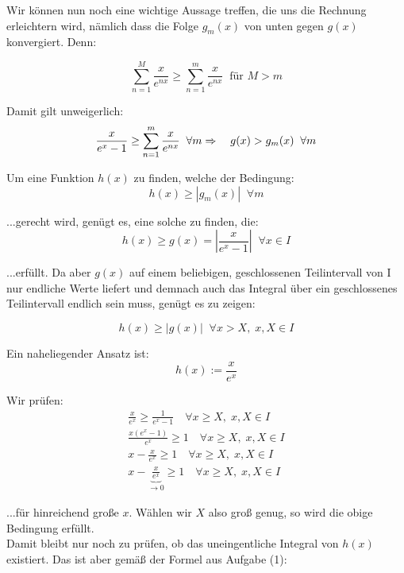\documentclass[a4paper,german,12pt,smallheadings]{scrartcl}
\begin{document}
Wir können nun noch eine wichtige Aussage treffen, die uns die Rechnung erleichtern wird, nämlich dass die Folge $g_m(x)$ von unten gegen $g(x)$ konvergiert. Denn:

\begin{equation*}
\sum_{n=1}^{M}\frac{x}{e^{nx}} \ge \sum_{n=1}^{m}\frac{x}{e^{nx}} \;\; \text{für $M>m$}
\end{equation*}

Damit gilt unweigerlich:
\begin{equation*}
\frac{x}{e^x-1} \ge \sum_{n=1}^{m}\frac{x}{e^{nx}} \;\; \forall m\\
\Rightarrow \quad g(x)>g_m(x) \;\; \forall m
\end{equation*}

Um eine Funktion $h(x)$ zu finden, welche der Bedingung:
\begin{equation*}
h(x) \geq |g_m(x)| \;\; \forall m
\end{equation*}

...gerecht wird, genügt es, eine solche zu finden, die:
\begin{equation*}
h(x)\geq g(x)=\left|\frac{x}{e^x-1}\right| \;\; \forall x \in I
\end{equation*}

...erfüllt. Da aber $g(x)$ auf einem beliebigen, geschlossenen Teilintervall von I nur endliche Werte liefert und demnach auch das Integral über ein geschlossenes Teilintervall endlich sein muss, genügt es zu zeigen:

\begin{equation*}
h(x) \geq |g(x)| \;\; \forall x>X, \; x,X\in I
\end{equation*}

Ein naheliegender Ansatz ist:
\begin{equation*}
h(x):=\frac{x}{e^x}
\end{equation*}

Wir prüfen:
\begin{align*}
\frac{x}{e^x} \geq \frac{1}{e^x-1} \quad \forall x\geq X, \; x,X\in I\\
\frac{x(e^x-1)}{e^x} \geq 1 \quad \forall x\geq X, \; x,X\in I\\
x-\frac{x}{e^x} \geq 1 \quad \forall x\geq X, \; x,X\in I\\
x-\underbrace{\frac{x}{e^x}}_{\rightarrow 0} \geq 1 \quad \forall x\geq X, \; x,X\in I
\end{align*}

...für hinreichend große $x$. Wählen wir $X$ also groß genug, so wird die obige Bedingung erfüllt.\\
Damit bleibt nur noch zu prüfen, ob das uneingentliche Integral von $h(x)$ existiert. Das ist aber gemäß der Formel aus Aufgabe (1):
\end{document}
